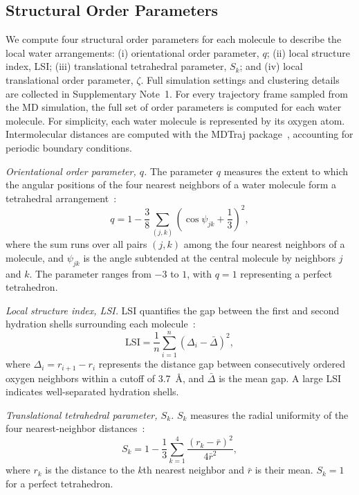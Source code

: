 \documentclass[aps, amsmath,amssymb, reprint, twocolumn, superscriptaddress]{revtex4-2}
\begin{document}
\subsection{Structural Order Parameters}
\label{sec:structural_order_parameter}
We compute four structural order parameters for each molecule to describe the local water arrangements: (i) orientational order parameter, $q$; (ii) local structure index, LSI; (iii) translational tetrahedral parameter, $S_k$; and (iv) local translational order parameter, $\zeta$. Full simulation settings and clustering details are collected in Supplementary Note~1. For every trajectory frame sampled from the MD simulation, the full set of order parameters is computed for each water molecule. For simplicity, each water molecule is represented by its oxygen atom. Intermolecular distances are computed with the MDTraj package~\cite{mcgibbon_mdtraj_2015}, accounting for periodic boundary conditions.

\textit{Orientational order parameter, $q$.} The parameter $q$ measures the extent to which the angular positions of the four nearest neighbors of a water molecule form a tetrahedral arrangement~\cite{chau_new_1998,errington_relationship_2001}:
\begin{equation}
q = 1 - \frac{3}{8}\sum_{(j,k)}\left(\cos\psi_{jk}+\frac{1}{3}\right)^{2},
\label{eq:q}
\end{equation}
where the sum runs over all pairs $(j,k)$ among the four nearest neighbors of a molecule, and $\psi_{jk}$ is the angle subtended at the central molecule by neighbors $j$ and $k$. The parameter ranges from $-3$ to $1$, with $q=1$ representing a perfect tetrahedron.

\textit{Local structure index, LSI.} LSI quantifies the gap between the first and second hydration shells surrounding each molecule~\cite{shiratani_growth_1996}:
\begin{equation}
\text{LSI} = \frac{1}{n}\sum_{i=1}^{n}\!\left(\Delta_i - \bar{\Delta}\right)^{2},
\label{eq:LSI}
\end{equation}
where $\Delta_i = r_{i+1} - r_i$ represents the distance gap between consecutively ordered oxygen neighbors within a cutoff of 3.7~\AA, and $\bar{\Delta}$ is the mean gap. A large LSI indicates well-separated hydration shells.

\textit{Translational tetrahedral parameter, $S_k$.} $S_k$ measures the radial uniformity of the four nearest-neighbor distances~\cite{duboue-dijon_characterization_2015}:
\begin{equation}
S_k = 1 - \frac{1}{3}\sum_{k=1}^{4}\frac{(r_k - \bar{r})^{2}}{4\bar{r}^{2}},
\label{eq:Sk}
\end{equation}
where $r_k$ is the distance to the $k$th nearest neighbor and $\bar{r}$ is their mean. $S_k = 1$ for a perfect tetrahedron.
\end{document}
